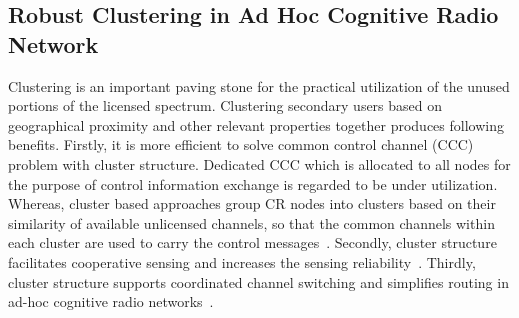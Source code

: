\subsection{Robust Clustering in Ad Hoc Cognitive Radio Network}
Clustering is an important paving stone for the practical utilization of the unused portions of the licensed spectrum.
Clustering secondary users based on geographical proximity and other relevant properties together produces following benefits.
Firstly, it is more efficient to solve common control channel (\gls{CCC}) problem with cluster structure.
Dedicated CCC which is allocated to all nodes for the purpose of control information exchange is regarded to be under utilization.
Whereas, cluster based approaches group CR nodes into clusters based on their similarity of available unlicensed channels, so that the common channels within each cluster are used to carry the control messages~\cite{Lazos09}.
Secondly, cluster structure facilitates cooperative sensing and increases the sensing reliability~\cite{Sun07_clustering_spectrum_secsing}.
Thirdly, cluster structure supports coordinated channel switching and simplifies routing in ad-hoc cognitive radio networks~\cite{cluster_routing_2013ICC}.


